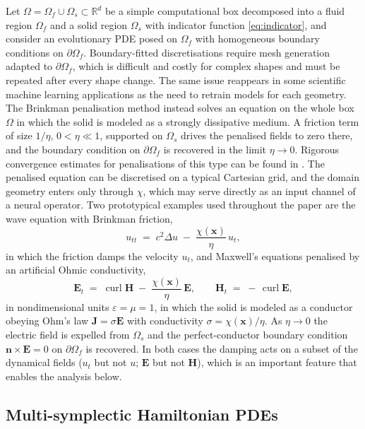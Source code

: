 \documentclass[11pt]{article}
\theoremstyle{definition}
\theoremstyle{remark}
\newcommand{\R}{\mathbb{R}}
\newcommand{\bx}{\bm{x}}
\newcommand{\bE}{\bm{E}}
\newcommand{\bH}{\bm{H}}
\newcommand{\chixx}{\chi(\bx)}
\DeclareMathOperator{\curl}{curl}
\begin{document}
Let $\Omega=\Omega_f\cup\Omega_s\subset\R^d$ be a simple computational
box decomposed into a fluid region $\Omega_f$ and a solid region
$\Omega_s$ with indicator function \eqref{eq:indicator}, and consider
an evolutionary PDE posed on $\Omega_f$ with homogeneous boundary
conditions on $\partial\Omega_f$.  Boundary-fitted discretisations
require mesh generation adapted to $\partial\Omega_f$, which is
difficult and costly for complex shapes and must be repeated after
every shape change. The same issue reappears in some scientific machine learning applications as the need to
retrain models for each geometry.  The Brinkman penalisation method
\cite{angot1999penalisation} instead solves an equation on the whole
box $\Omega$ in which the solid is modeled as a strongly dissipative
medium. A friction term of size $1/\eta$, $0<\eta\ll1$, supported on
$\Omega_s$ drives the penalised fields to zero there, and the boundary
condition on $\partial\Omega_f$ is recovered in the limit
$\eta\to0$. Rigorous convergence estimates for penalisations of this
type can be found in \cite{angot1999penalisation,kolomenskiy2009fourier}.
The penalised equation can be discretised on a typical Cartesian grid, and the domain geometry enters only through $\chi$, which may serve directly as an
input channel of a neural operator.  Two prototypical examples used throughout the
paper are the wave equation with Brinkman friction,
\begin{equation}
\label{eq:wave-brinkman}
u_{tt} \;=\; c^2\Delta u \;-\; \frac{\chixx}{\eta}\,u_t ,
\end{equation}
in which the friction damps the velocity $u_t$, and Maxwell's
equations penalised by an artificial Ohmic conductivity,
\begin{equation}
\label{eq:maxwell-brinkman}
\bE_t \;=\; \curl \bH \;-\; \frac{\chixx}{\eta}\,\bE,
\qquad
\bH_t \;=\; -\,\curl \bE ,
\end{equation}
in nondimensional units $\varepsilon=\mu=1$, in which the solid is
modeled as a conductor obeying Ohm's law $\bm{J}=\sigma\bE$ with
conductivity $\sigma=\chixx/\eta$. As $\eta\to0$ the electric field is
expelled from $\Omega_s$ and the perfect-conductor boundary condition
$\bm{n}\times\bE=0$ on $\partial\Omega_f$ is recovered.  In both
cases the damping acts on a subset of the dynamical fields
($u_t$ but not $u$; $\bE$ but not $\bH$), which is an important feature that enables the analysis below.

\subsection{Multi-symplectic Hamiltonian PDEs}
\label{subsec:ms}
\end{document}
